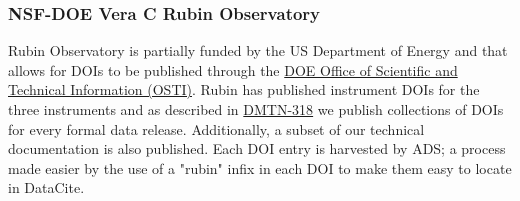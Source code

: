\documentclass[11pt,a4paper]{ivoa}
\begin{document}
\subsubsection{NSF-DOE Vera C Rubin Observatory}\hypertarget{nsf-doe-vera-c-rubin-observatory}{}\label{sec:nsf-doe-vera-c-rubin-observatory}

Rubin Observatory \citep{10.71929/rubin/2570308} is partially funded by the US Department of Energy and that allows for DOIs to be published through the \href{https://osti.gov/elink}{DOE Office of Scientific and Technical Information (OSTI)}. Rubin has published instrument DOIs for the three instruments and as described in \href{https://doi.org/10.71929/rubin/2583847}{DMTN-318} we publish collections of DOIs for every formal data release. Additionally, a subset of our technical documentation is also published. Each DOI entry is harvested by ADS; a process made easier by the use of a "rubin" infix in each DOI to make them easy to locate in DataCite.

%

\end{document}
